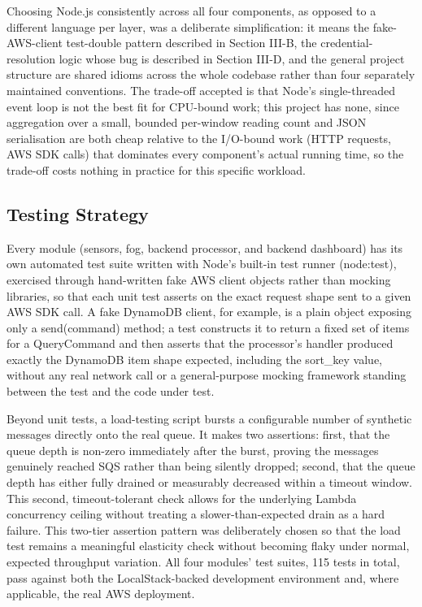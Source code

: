 \documentclass[conference]{IEEEtran}
\begin{document}
Choosing Node.js consistently across all four components, as opposed to a different language per layer, was a deliberate simplification: it means the fake-AWS-client test-double pattern described in Section III-B, the credential-resolution logic whose bug is described in Section III-D, and the general project structure are shared idioms across the whole codebase rather than four separately maintained conventions. The trade-off accepted is that Node's single-threaded event loop is not the best fit for CPU-bound work; this project has none, since aggregation over a small, bounded per-window reading count and JSON serialisation are both cheap relative to the I/O-bound work (HTTP requests, AWS SDK calls) that dominates every component's actual running time, so the trade-off costs nothing in practice for this specific workload.

\subsection{Testing Strategy}
Every module (sensors, fog, backend processor, and backend dashboard) has its own automated test suite written with Node's built-in test runner (node:test), exercised through hand-written fake AWS client objects rather than mocking libraries, so that each unit test asserts on the exact request shape sent to a given AWS SDK call. A fake DynamoDB client, for example, is a plain object exposing only a send(command) method; a test constructs it to return a fixed set of items for a QueryCommand and then asserts that the processor's handler produced exactly the DynamoDB item shape expected, including the sort\_key value, without any real network call or a general-purpose mocking framework standing between the test and the code under test.

Beyond unit tests, a load-testing script bursts a configurable number of synthetic messages directly onto the real queue. It makes two assertions: first, that the queue depth is non-zero immediately after the burst, proving the messages genuinely reached SQS rather than being silently dropped; second, that the queue depth has either fully drained or measurably decreased within a timeout window. This second, timeout-tolerant check allows for the underlying Lambda concurrency ceiling without treating a slower-than-expected drain as a hard failure. This two-tier assertion pattern was deliberately chosen so that the load test remains a meaningful elasticity check without becoming flaky under normal, expected throughput variation. All four modules' test suites, 115 tests in total, pass against both the LocalStack-backed development environment and, where applicable, the real AWS deployment.
\end{document}
